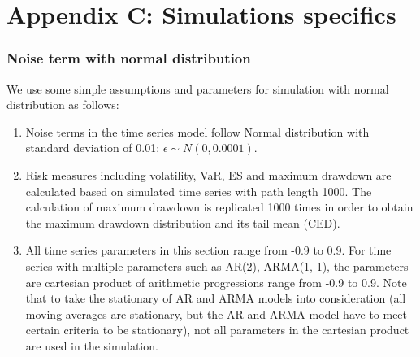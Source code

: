 \documentclass[11pt]{article}
\begin{document}
\section{Appendix C: Simulations specifics} \label{App:AppendixC}
\subsubsection{Noise term with normal distribution}

We use some simple assumptions and parameters for simulation with normal distribution as follows:

\begin{enumerate}
\item Noise terms in the time series model follow Normal distribution with standard deviation of 0.01: $\epsilon \sim N(0, 0.0001)$.
\item Risk measures including volatility, VaR, ES and maximum drawdown are calculated based on simulated time series with path length 1000. The calculation of maximum drawdown is replicated 1000 times in order to obtain the maximum drawdown distribution and its tail mean (CED).
\item All time series parameters in this section range from -0.9 to 0.9. For time series with multiple parameters such as AR(2), ARMA(1, 1), the parameters are cartesian product of arithmetic progressions range from -0.9 to 0.9. Note that to take the stationary of AR and ARMA models into consideration (all moving averages are stationary, but the AR and ARMA model have to meet certain criteria to be stationary), not all parameters in the cartesian product are used in the simulation.
\end{enumerate}
\end{document}

